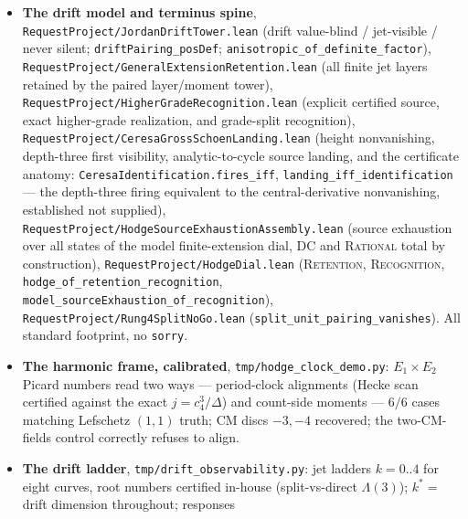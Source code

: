 \documentclass[11pt]{article}
\theoremstyle{definition}
\theoremstyle{remark}
\begin{document}
\begin{itemize}
every good $p<400$, certified by point counts --- so the $1$D readout provably
cannot separate the members (Faltings) --- while the retained channels separate
every pair ($\Omega$, $T$, $c_p$, each computed from the curve, never from
$L$), and the Cassels combination $\Omega\prod c_p/|T|^{2}$ is invariant across
the class to $2.2\times10^{-16}$; $|\Shamath|$ landed $=1$ on every member. No
ledger failure found. The v2 escalation --- a pair with equal \emph{full}
ledger and different $\Shamath$ or, in higher dimension, equal zeta and
different Chow data --- is the genuine clause-(c) falsifier hunt.
\item \textbf{The drift model and terminus spine},
\texttt{RequestProject/JordanDriftTower.lean} (drift value-blind / jet-visible
/ never silent; \texttt{driftPairing\_posDef};
\texttt{anisotropic\_of\_definite\_factor}),
\texttt{RequestProject/GeneralExtensionRetention.lean} (all finite jet layers
retained by the paired layer/moment tower),
\texttt{RequestProject/HigherGradeRecognition.lean} (explicit certified source,
exact higher-grade realization, and grade-split recognition),
\texttt{RequestProject/CeresaGrossSchoenLanding.lean} (height nonvanishing,
depth-three first visibility, analytic-to-cycle source landing, and the
certificate anatomy: \texttt{CeresaIdentification.fires\_iff},
\texttt{landing\_iff\_identification} --- the depth-three firing equivalent
to the central-derivative nonvanishing, established not supplied),
\texttt{RequestProject/HodgeSourceExhaustionAssembly.lean} (source
exhaustion over all states of the model finite-extension dial, \textsc{DC}
and \textsc{Rational} total by construction),
\texttt{RequestProject/HodgeDial.lean} (\textsc{Retention},
\textsc{Recognition}, \texttt{hodge\_of\_retention\_recognition},
\texttt{model\_sourceExhaustion\_of\_recognition}),
\texttt{RequestProject/Rung4SplitNoGo.lean}
(\texttt{split\_unit\_pairing\_vanishes}). All standard footprint, no
\texttt{sorry}.
\item \textbf{The harmonic frame, calibrated}, \texttt{tmp/hodge\_clock\_demo.py}:
$E_1\times E_2$ Picard numbers read two ways --- period-clock alignments
(Hecke scan certified against the exact $j=c_4^3/\Delta$) and count-side
moments --- $6/6$ cases matching Lefschetz $(1,1)$ truth; CM discs $-3,-4$
recovered; the two-CM-fields control correctly refuses to align.
\item \textbf{The drift ladder}, \texttt{tmp/drift\_observability.py}: jet
ladders $k=0..4$ for eight curves, root numbers certified in-house
(split-vs-direct $\Lambda(3)$); $k^*=$ drift dimension throughout; responses

\end{itemize}
\end{document}
